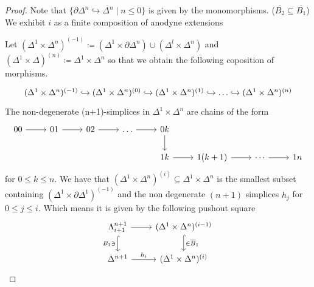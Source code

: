 \begin{proof}
    Note that 
    $\overline{\{\partial \Delta^n \hookrightarrow \Delta^n \mid n \leq 0 \}}$
    is given by the monomorphisms.
    ($\overline{B_2} \subseteq \overline{B_1}$) 
    We exhibit $i$ as a finite composition of anodyne extensions
    
    Let $(\Delta^1 \times \Delta^n)^{(-1)} \coloneqq(\Delta^1 \times \partial \Delta^n) \cup ( \Delta^{l} \times \Delta^n)$ and $(\Delta^1 \times \Delta)^{(n)} \coloneqq\Delta^1 \times \Delta^n$ so that we obtain the following coposition of morphisms.
    \[
    \begin{tikzcd}
        (\Delta^1 \times \Delta^n)^{(-1)} \hookrightarrow (\Delta^1 \times \Delta^n)^{(0)} \hookrightarrow (\Delta^1 \times \Delta^n)^{(1)}\hookrightarrow \dotsc \hookrightarrow(\Delta^1 \times \Delta^n)^{(n)} 
    \end{tikzcd}
    \]
    The non-degenerate (n+1)-simplices in $\Delta^1 \times \Delta^n$ are chains of the form
    \[
    \begin{tikzcd}
        00
        \ar[r]
        &
        01
        \ar[r]
        &
        02
        \ar[r]
        &
        \dotsc
        \ar[r]
        &
        0k
        \ar[d]
        \\
        &&&&
        1k
        \ar[r]
        &
        1(k+1)
        \ar[r]
        &
        \cdots
        \ar[r]
        &
        1n
    \end{tikzcd}
    \]
    for $0 \leq k \leq n$.
    We have that $(\Delta^1 \times \Delta^n)^{(i)} \subseteq \Delta^1 \times \Delta^n$ is the smallest subset containing $( \Delta^1 \times \partial \Delta^1)^{(-1)}$ and the non degenerate $(n+1)$ simplices $h_j$ for $0 \leq j \leq i$.
    Which means it is given by the following pushout square
    \[
    \begin{tikzcd}
        \Lambda_{i+1}^{n+1}
        \ar[r]
        \ar[d, hook, " B_1 \ni"']
        &
        (\Delta^1 \times \Delta^n)^{(i-1)}
        \ar[d, hook, "\in \overline{B}_1"]
        \\
        \Delta^{n+1} 
        \ar[r, "h_i"]
        &
        (\Delta^1 \times \Delta^n)^{(i)}
    \end{tikzcd}
    \]


\end{proof}

